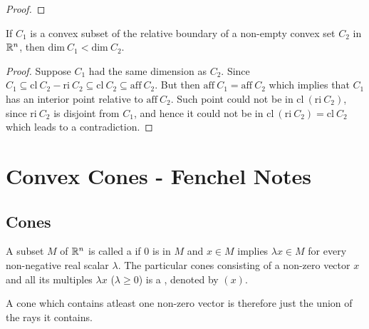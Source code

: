 \documentclass[11pt,a4paper]{article}
\begin{document}
\begin{proof}
    
\end{proof}

\begin{corollary}
    If $C_1$ is a convex subset of the relative boundary of a non-empty convex set $C_2$ in $\mathbb{R}^n$, then $\mathrm{dim}\ C_1<\mathrm{dim}\ C_2$.
\end{corollary}

\begin{proof}
    Suppose $C_1$ had the same dimension as $C_2$. Since $C_1\subseteq \mathrm{cl}\ C_2-\mathrm{ri}\ C_2\subseteq\mathrm{cl}\ C_2\subseteq\mathrm{aff}\ C_2$. But then $\mathrm{aff}\ C_1 = \mathrm{aff}\ C_2$ which implies that $C_1$ has an interior point relative to $\mathrm{aff}\ C_2$. Such point could not be in $\mathrm{cl}\ (\mathrm{ri}\ C_2)$, since $\mathrm{ri}\ C_2$ is disjoint from $C_1$, and hence it could not be in $\mathrm{cl}\ (\mathrm{ri}\ C_2) = \mathrm{cl}\ C_2$ which leads to a contradiction.
\end{proof}

\newpage
\section*{Convex Cones - Fenchel Notes}

\subsection*{Cones}


\begin{definition}
    A subset $M$ of $\mathbb{R}^n$ is called a  if $0$ is in $M$ and $x\in M$ implies $\lambda x\in M$ for every non-negative real scalar $\lambda$. The particular cones consisting of a non-zero vector $x$ and all its multiples $\lambda x$ ($\lambda \ge 0$) is a , denoted by $(x)$. 
\end{definition}

\begin{remark}
    A cone which contains atleast one non-zero vector is therefore just the union of the rays it contains.
\end{remark}
\end{document}
